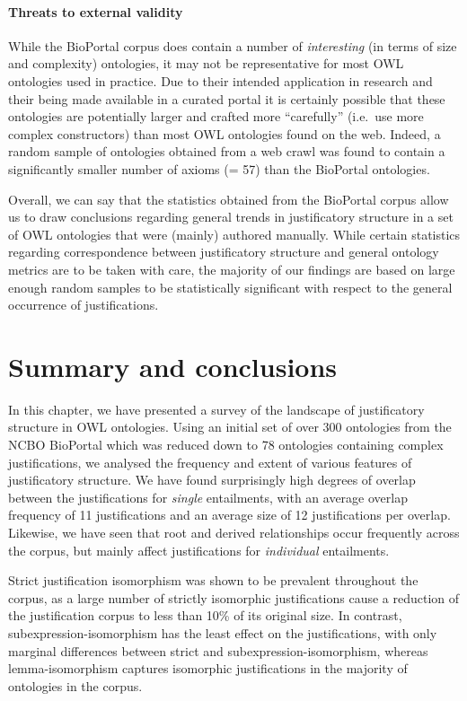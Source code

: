 \paragraph{Threats to external validity}

While the BioPortal corpus does contain a number of \emph{interesting} (in terms of size and complexity) ontologies, it may not be representative for most OWL ontologies used in practice. Due to their intended application in research and their being made available in a curated portal it is certainly possible that these ontologies are potentially larger and crafted more \enquote{carefully} (i.e.\ use more complex constructors) than most OWL ontologies found on the web. Indeed, a random sample of ontologies obtained from a web crawl \cite{goncalves13aa} was found to contain a significantly smaller number of axioms (\median = 57) than the BioPortal ontologies.

Overall, we can say that the statistics obtained from the BioPortal corpus allow us to draw conclusions regarding general trends in justificatory structure in a set of OWL ontologies that were (mainly) authored manually. While certain statistics regarding correspondence between justificatory structure and general ontology metrics are to be taken with care, the majority of our findings are based on large enough random samples to be statistically significant with respect to the general occurrence of justifications.



\section{Summary and conclusions}

In this chapter, we have presented a survey of the landscape of justificatory structure in OWL ontologies. Using an initial set of over 300 ontologies from the NCBO BioPortal which was reduced down to 78 ontologies containing complex justifications, we analysed the frequency and extent of various features of justificatory structure. We have found surprisingly high degrees of overlap between the justifications for \emph{single} entailments, with an average overlap frequency of 11 justifications and an average size of 12 justifications per overlap. Likewise, we have seen that root and derived relationships occur frequently across the corpus, but mainly affect justifications for \emph{individual} entailments.

Strict justification isomorphism was shown to be prevalent throughout the corpus, as a large number of strictly isomorphic justifications cause a reduction of the justification corpus to less than 10\% of its original size. In contrast, subexpression-isomorphism has the least effect on the justifications, with only marginal differences between strict and subexpression-isomorphism, whereas lemma-isomorphism captures isomorphic justifications in the majority of ontologies in the corpus.

